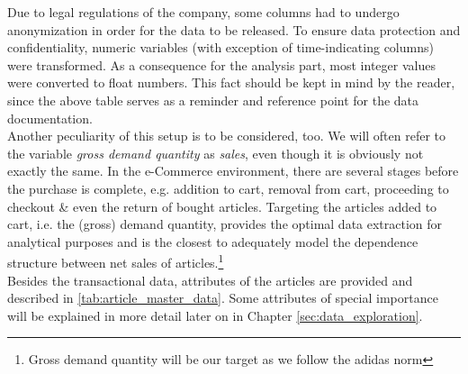 Due to legal regulations of the company, some columns had to undergo anonymization in order for the data to be released. To ensure data protection and confidentiality, numeric variables (with exception of time-indicating columns) were transformed. As a consequence for the analysis part, most integer values were converted to float numbers. This fact should be kept in mind by the reader, since the above table serves as a reminder and reference point for the data documentation.\\

Another peculiarity of this setup is to be considered, too. We will often refer to the variable \textit{gross demand quantity} as \textit{sales}, even though it is obviously not exactly the same. In the e-Commerce environment, there are several stages before the purchase is complete, e.g. addition to cart, removal from cart, proceeding to checkout \& even the return of bought articles. Targeting the articles added to cart, i.e. the (gross) demand quantity, provides the optimal data extraction for analytical purposes and is the closest to adequately model the dependence structure between net sales of articles.\footnote{Gross demand quantity will be our target as we follow the adidas norm}  \\

Besides the transactional data, attributes of the articles are provided and described in \autoref{tab:article_master_data}. Some attributes of special importance will be explained in more detail later on in Chapter \ref{sec:data_exploration}. \\

